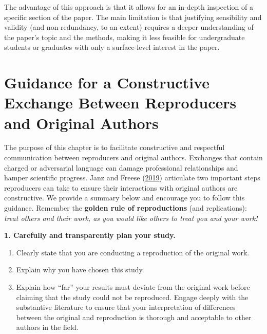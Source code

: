 \documentclass[]{book}
\providecommand{\tightlist}{%
  \setlength{\itemsep}{0pt}\setlength{\parskip}{0pt}}
\begin{document}
The advantage of this approach is that it allows for an in-depth inspection of a specific section of the paper. The main limitation is that justifying sensibility and validity (and non-redundancy, to an extent) requires a deeper understanding of the paper's topic and the methods, making it less feasible for undergraduate students or graduates with only a surface-level interest in the paper.

\hypertarget{guidance-for-a-constructive-exchange-between-reproducers-and-original-authors}{%
\chapter{Guidance for a Constructive Exchange Between Reproducers and Original Authors}\label{guidance-for-a-constructive-exchange-between-reproducers-and-original-authors}}

The purpose of this chapter is to facilitate constructive and respectful communication between reproducers and original authors. Exchanges that contain charged or adversarial language can damage professional relationships and hamper scientific progress. Janz and Freese (\href{https://www.mzes.uni-mannheim.de/openscience/wp-content/uploads/2019/01/Janz-Freese_-Good-and-Bad-Replications-1.pdf}{2019}) articulate two important steps reproducers can take to ensure their interactions with original authors are constructive. We provide a summary below and encourage you to follow this guidance. Remember the \textbf{golden rule of reproductions} (and replications): \emph{treat others and their work, as you would like others to treat you and your work!}

\textbf{1. Carefully and transparently plan your study.}

\begin{enumerate}
\def\labelenumi{\alph{enumi}.}
\tightlist
\item
  Clearly state that you are conducting a reproduction of the original work.\\
\item
  Explain why you have chosen this study.
\item
  Explain how ``far'' your results must deviate from the original work before claiming that the study could not be reproduced. Engage deeply with the substantive literature to ensure that your interpretation of differences between the original and reproduction is thorough and acceptable to other authors in the field.
\end{enumerate}
\end{document}
